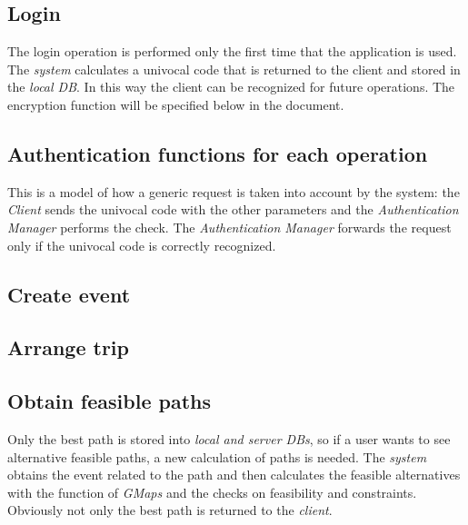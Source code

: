 \subsection{Login}
			\noindent{}
			The login operation is performed only the first time that the application is used. 
			The \textit{system} calculates a univocal code that is returned to the client and stored in the \textit{local DB}. In this way the client can be recognized for future operations. 
			The encryption function will be specified below in the document.
\subsection{Authentication functions for each operation}
		\noindent{}
		This is a model of how a generic request is taken into account by the system: the \textit{Client} sends the univocal code with the other parameters and the \textit{Authentication Manager} performs the check. 
		The \textit{Authentication Manager} forwards the request only if the univocal code is correctly recognized.
\subsection{Create event}
		\noindent{}
\subsection{Arrange trip}
		\noindent{}
\subsection{Obtain feasible paths}
		\noindent{}
		Only the best path is stored into \textit{local and server DBs}, so if a user wants to see alternative feasible paths, a new calculation of paths is needed. 
		The \textit{system} obtains the event related to the path and then calculates the feasible alternatives with the function of \textit{GMaps} and the checks on feasibility and constraints. Obviously not only the best path is returned to the \textit{client}.
